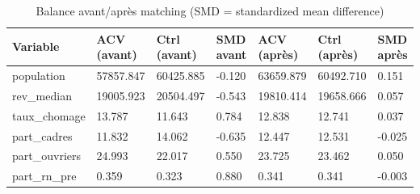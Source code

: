 \begin{table}
\caption{Balance avant/après matching (SMD = standardized mean difference)}
\label{tab:matching_balance}
\begin{tabular}{lllllll}
\toprule
Variable & ACV (avant) & Ctrl (avant) & SMD avant & ACV (après) & Ctrl (après) & SMD après \\
\midrule
population & 57857.847 & 60425.885 & -0.120 & 63659.879 & 60492.710 & 0.151 \\
rev\_median & 19005.923 & 20504.497 & -0.543 & 19810.414 & 19658.666 & 0.057 \\
taux\_chomage & 13.787 & 11.643 & 0.784 & 12.838 & 12.741 & 0.037 \\
part\_cadres & 11.832 & 14.062 & -0.635 & 12.447 & 12.531 & -0.025 \\
part\_ouvriers & 24.993 & 22.017 & 0.550 & 23.725 & 23.462 & 0.050 \\
part\_rn\_pre & 0.359 & 0.323 & 0.880 & 0.341 & 0.341 & -0.003 \\
\bottomrule
\end{tabular}
\end{table}
